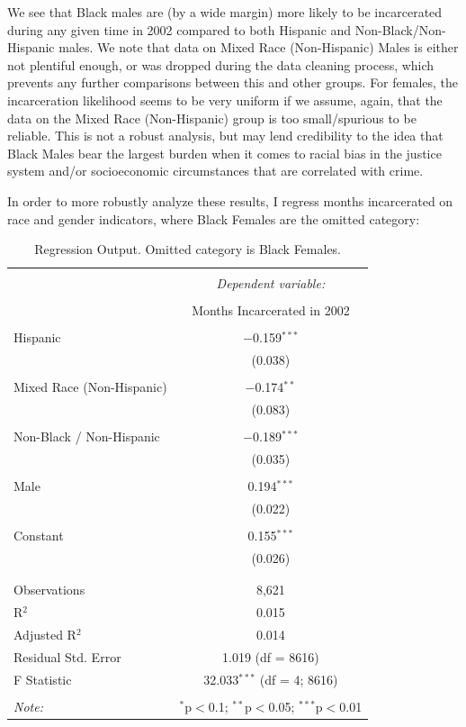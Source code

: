 \documentclass[11pt]{amsart}
\numberwithin{equation}{section}
\numberwithin{figure}{section}
\numberwithin{theorem}{section}
\begin{document}
We see that Black males are (by a wide margin) more likely to be incarcerated during any given time in 2002 compared to both Hispanic and Non-Black/Non-Hispanic males. We note that data on Mixed Race (Non-Hispanic) Males is either not plentiful enough, or was dropped during the data cleaning process, which prevents any further comparisons between this and other groups. For females, the incarceration likelihood seems to be very uniform if we assume, again, that the data on the Mixed Race (Non-Hispanic) group is too small/spurious to be reliable. This is not a robust analysis, but may lend credibility to the idea that Black Males bear the largest burden when it comes to racial bias in the justice system and/or socioeconomic circumstances that are correlated with crime.

In order to more robustly analyze these results, I regress months incarcerated on race and gender indicators, where Black Females are the omitted category:

\begin{table}[!htbp] \centering 
  \caption{Regression Output. Omitted category is Black Females.} 
  \label{tab:regression} 
\begin{tabular}{@{\extracolsep{5pt}}lc} 
\\[-1.8ex]\hline 
\hline \\[-1.8ex] 
 & \multicolumn{1}{c}{\textit{Dependent variable:}} \\ 
\cline{2-2} 
\\[-1.8ex] & Months Incarcerated in 2002 \\ 
\hline \\[-1.8ex] 
 Hispanic & $-$0.159$^{***}$ \\ 
  & (0.038) \\ 
  & \\ 
 Mixed Race (Non-Hispanic) & $-$0.174$^{**}$ \\ 
  & (0.083) \\ 
  & \\ 
 Non-Black / Non-Hispanic & $-$0.189$^{***}$ \\ 
  & (0.035) \\ 
  & \\ 
 Male & 0.194$^{***}$ \\ 
  & (0.022) \\ 
  & \\ 
 Constant & 0.155$^{***}$ \\ 
  & (0.026) \\ 
  & \\ 
\hline \\[-1.8ex] 
Observations & 8,621 \\ 
R$^{2}$ & 0.015 \\ 
Adjusted R$^{2}$ & 0.014 \\ 
Residual Std. Error & 1.019 (df = 8616) \\ 
F Statistic & 32.033$^{***}$ (df = 4; 8616) \\ 
\hline 
\hline \\[-1.8ex] 
\textit{Note:}  & \multicolumn{1}{r}{$^{*}$p$<$0.1; $^{**}$p$<$0.05; $^{***}$p$<$0.01} \\ 
\end{tabular} 
\end{table} 
\end{document}
